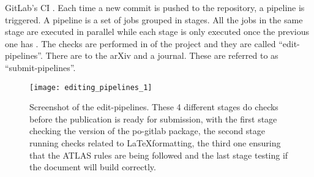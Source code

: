 GitLab’s CI . Each time a new commit is pushed to the repository, a pipeline is triggered.
A pipeline is a set of jobs grouped in stages. All the jobs in the same stage are executed in parallel while each stage is only executed once the previous one has .
The checks are performed in  of the project and they are called \enquote{edit-pipelines}.
There are  to the arXiv and a journal. These are referred to as \enquote{submit-pipelines}.

\begin{figure}[htb]
  \centering
  \texttt{[image: editing\_pipelines\_1]}
  \caption{Screenshot of the edit-pipelines. These 4 different stages do checks before the publication is ready for submission, with the first stage checking the version of the po-gitlab package, the second stage running checks related to \LaTeX formatting, the third one ensuring that the ATLAS rules are being followed and the last stage testing if the document will build correctly.}%
  \label{fig:edit-pipelines}
\end{figure}

